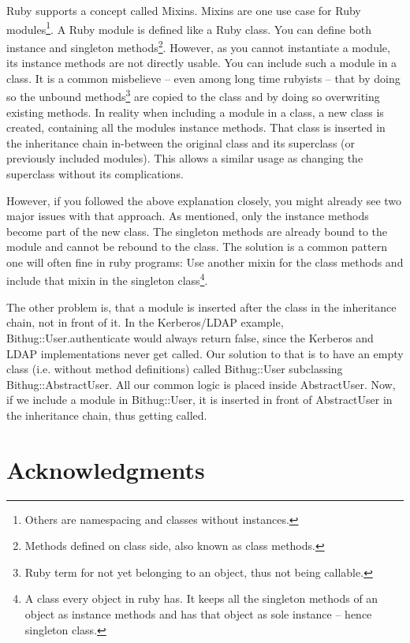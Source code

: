 \documentclass{llncs}
\begin{document}
Ruby supports a concept called Mixins\cite{apel2004using}. Mixins are one use case for Ruby modules\footnote{Others are namespacing
and classes without instances.}. A Ruby module is defined like a Ruby class. You can define both instance and singleton
methods\footnote{Methods defined on class side, also known as class methods.}. However, as you cannot instantiate a module,
its instance methods are not directly usable. You can include such a module in a class. It is a common misbelieve – even among
long time rubyists – that by doing so the unbound methods\footnote{Ruby term for not yet belonging to an object, thus not being
callable.} are copied to the class and by doing so overwriting existing methods. In reality when including a module in a class,
a new class is created, containing all the modules instance methods. That class is inserted in the inheritance chain in-between
the original class and its superclass (or previously included modules). This allows a similar usage as changing the superclass
without its complications.

However, if you followed the above explanation closely, you might already see two major issues with that approach. As mentioned,
only the instance methods become part of the new class. The singleton methods are already bound to the module and cannot be
rebound to the class. The solution is a common pattern one will often fine in ruby programs: Use another mixin for the class methods
and include that mixin in the singleton class\footnote{A class every object in ruby has. It keeps all the singleton methods of an
object as instance methods and has that object as sole instance – hence singleton class.}.

The other problem is, that a module is inserted after the class in the inheritance chain, not in front of it. In the Kerberos/LDAP
example, Bithug::User.authenticate would always return false, since the Kerberos and LDAP implementations never get called. Our
solution to that is to have an empty class (i.e. without method definitions) called Bithug::User subclassing Bithug::AbstractUser.
All our common logic is placed inside AbstractUser. Now, if we include a module in Bithug::User, it is inserted in front of AbstractUser
in the inheritance chain, thus getting called.

\section*{Acknowledgments}


\clearpage
\end{document}
